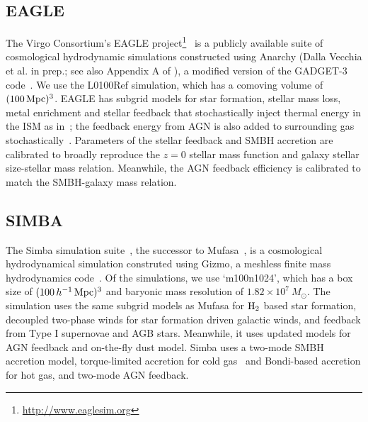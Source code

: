 \subsection{EAGLE} \label{sec:eagle} 
The Virgo Consortium's EAGLE
project\footnote{\url{http://www.eaglesim.org}}~\citep{schaye2015, crain2015,
mcalpine2016} is a publicly available suite of cosmological hydrodynamic
simulations constructed using {\sc Anarchy} (Dalla Vecchia et al. in prep.; 
see also Appendix A of \citealt{schaye2015}), a modified version of the 
{\sc GADGET-3} code~\citep{springel2005}. We use the L0100Ref simulation,
which has a comoving volume of $(100\,{\rm Mpc})^3$. %
EAGLE has subgrid models for star formation, stellar mass loss, metal enrichment
and stellar feedback that stochastically inject thermal energy in the ISM as
in~\citep{dallavecchia2012}; the feedback energy from AGN is also added to
surrounding gas stochastically~\citep{booth2009}. Parameters of the stellar 
feedback and SMBH accretion are calibrated to broadly reproduce the $z=0$ 
stellar mass function and galaxy stellar size-stellar mass relation. Meanwhile, 
the AGN feedback efficiency is calibrated to match the SMBH-galaxy mass relation. 

\subsection{SIMBA} \label{sec:simba}
The {\sc Simba} simulation suite~\citep{dave2019}, the successor to {\sc
Mufasa}~\citep{dave2016, dave2017, dave2017a}, is a cosmological hydrodynamical
simulation construted using {\sc Gizmo}, a meshless finite mass hydrodynamics 
code~\citep{hopkins2015, hopkins2017}. Of the simulations, we use
`m100n1024', which has a box size of $(100\,h^{-1}\,{\rm Mpc})^3$ and baryonic 
mass resolution of $1.82 \times 10^7\ M_\odot$. The simulation uses the same
subgrid models as {\sc Mufasa} for $\rm H_2$ based star formation, decoupled
two-phase winds for star formation driven galactic winds, and feedback from 
Type I supernovae and AGB stars. Meanwhile, it uses updated models for AGN
feedback and on-the-fly dust model. {\sc Simba} uses a two-mode SMBH accretion 
model, torque-limited accretion for cold gas~\citep{angles-alcazar2017} and 
Bondi-based accretion for hot gas, and two-mode AGN feedback. %

